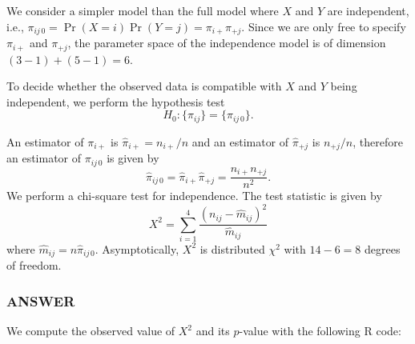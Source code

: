 \documentclass[
]{article}
\newenvironment{Shaded}{\begin{snugshade}}{\end{snugshade}}
\newcommand{\AttributeTok}[1]{\textcolor[rgb]{0.13,0.29,0.53}{#1}}
\newcommand{\ConstantTok}[1]{\textcolor[rgb]{0.56,0.35,0.01}{#1}}
\newcommand{\DecValTok}[1]{\textcolor[rgb]{0.00,0.00,0.81}{#1}}
\newcommand{\FunctionTok}[1]{\textcolor[rgb]{0.13,0.29,0.53}{\textbf{#1}}}
\newcommand{\NormalTok}[1]{#1}
\newcommand{\OtherTok}[1]{\textcolor[rgb]{0.56,0.35,0.01}{#1}}
\newcommand{\SpecialCharTok}[1]{\textcolor[rgb]{0.81,0.36,0.00}{\textbf{#1}}}
\newcommand{\StringTok}[1]{\textcolor[rgb]{0.31,0.60,0.02}{#1}}
\begin{document}
We consider a simpler model than the full model where \(X\) and \(Y\)
are independent, i.e.,
\(\pi_{i j\,0} = \Pr(X=i)\Pr(Y=j) = \pi_{i+}\pi_{+j}\). Since we are
only free to specify \(\pi_{i+}\) and \(\pi_{+j}\), the parameter space
of the independence model is of dimension \((3-1) + (5-1) = 6\).

To decide whether the observed data is compatible with \(X\) and \(Y\)
being independent, we perform the hypothesis test \[
  H_0 : \{\pi_{i j}\} = \{\pi_{i j\,0}\}.
\]

An estimator of \(\pi_{i+}\) is \(\hat{\pi}_{i+} = n_{i+}/n\) and an
estimator of \(\hat{\pi}_{+j}\) is \(n_{+j}/n\), therefore an estimator
of \(\pi_{i j\,0}\) is given by \[
  \hat{\pi}_{i j\,0} = \hat{\pi}_{i+} \hat{\pi}_{+j} = \frac{n_{i+}n_{+j}}{n^2}.
\] We perform a chi-square test for independence. The test statistic is
given by \[
  X^2 = \sum_{i=1}^{4} \frac{(n_{i j} - \hat{m}_{i j})^2}{\hat{m}_{i j}}
\] where \(\hat{m}_{i j} = n \hat{\pi}_{i j\,0}\). Asymptotically,
\(X^2\) is distributed \(\chi^2\) with \(14 - 6 = 8\) degrees of
freedom.

\hypertarget{answer-10}{%
\subsubsection{ANSWER}\label{answer-10}}

We compute the observed value of \(X^2\) and its \(p\)-value with the
following R code:

\begin{Shaded}
\end{Shaded}
\end{document}
